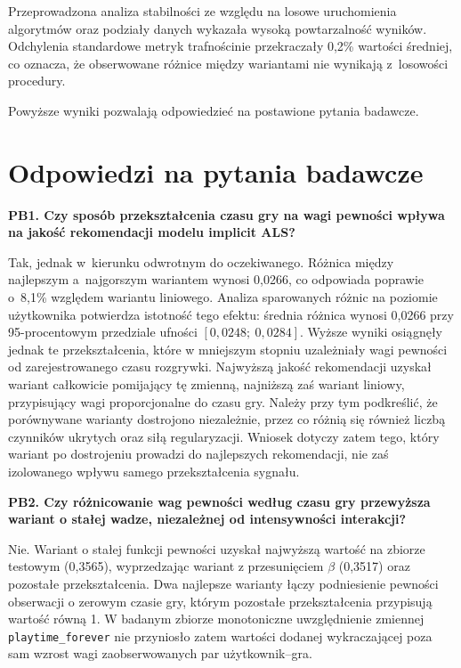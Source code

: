 Przeprowadzona analiza stabilności ze względu na losowe uruchomienia algorytmów oraz podziały danych wykazała wysoką powtarzalność wyników. Odchylenia standardowe metryk trafnościnie przekraczały 0,2\% wartości średniej, co oznacza, że obserwowane różnice między wariantami nie wynikają z~losowości procedury.

Powyższe wyniki pozwalają odpowiedzieć na postawione pytania badawcze.

\section{Odpowiedzi na pytania badawcze}

\textbf{PB1. Czy sposób przekształcenia czasu gry na wagi pewności wpływa na jakość rekomendacji modelu implicit ALS?}

Tak, jednak w~kierunku odwrotnym do oczekiwanego. Różnica \ndcg{} między najlepszym a~najgorszym wariantem wynosi 0,0266, co odpowiada poprawie o~8,1\% względem wariantu liniowego. Analiza sparowanych różnic na poziomie użytkownika potwierdza istotność tego efektu: średnia różnica wynosi 0,0266 przy 95-procentowym przedziale ufności $[0{,}0248;\ 0{,}0284]$. Wyższe wyniki osiągnęły jednak te przekształcenia, które w mniejszym stopniu uzależniały wagi pewności od zarejestrowanego czasu rozgrywki. Najwyższą jakość rekomendacji uzyskał wariant całkowicie pomijający tę zmienną, najniższą zaś wariant liniowy, przypisujący wagi proporcjonalne do czasu gry. Należy przy tym podkreślić, że porównywane warianty dostrojono niezależnie, przez co różnią się również liczbą czynników ukrytych oraz siłą regularyzacji. Wniosek dotyczy zatem tego, który wariant po dostrojeniu prowadzi do najlepszych rekomendacji, nie zaś izolowanego wpływu samego przekształcenia sygnału.

\textbf{PB2. Czy różnicowanie wag pewności według czasu gry przewyższa wariant o stałej wadze, niezależnej od intensywności interakcji?}

Nie. Wariant o stałej funkcji pewności uzyskał najwyższą wartość \ndcg{} na zbiorze testowym (0,3565), wyprzedzając wariant z przesunięciem $\beta$ (0,3517) oraz pozostałe przekształcenia. Dwa najlepsze warianty łączy podniesienie pewności obserwacji o zerowym czasie gry, którym pozostałe przekształcenia przypisują wartość równą 1. W badanym zbiorze monotoniczne uwzględnienie zmiennej \texttt{playtime\_forever} nie przyniosło zatem wartości dodanej wykraczającej poza sam wzrost wagi zaobserwowanych par użytkownik--gra.

